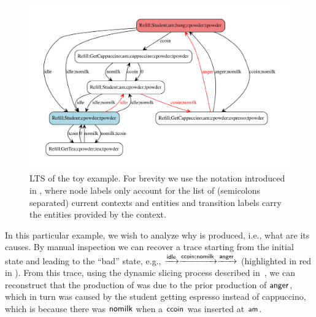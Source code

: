 \begin{figure}
\includegraphics[scale=.3]{./figs/toylts-traced}
\caption{LTS of the toy example. For brevity we use the notation introduced in , where node labels only account for the list of (semicolons separated) current contexts and entities and transition labels carry the entities provided by the context.\label{fig:toylts}}
\end{figure}

In this particular example, we wish to analyze why \bang is produced, i.e., what are its causes. By manual inspection we can recover a trace starting from the initial state and leading to the ``bad'' state, e.g., $\xrightarrow{{\text{\sffamily idle}}}\xrightarrow{{\text{\sffamily ccoin}};{\text{\sffamily nomilk}}}\xrightarrow{{\text{\sffamily anger}}}$ (highlighted in red in ). 
From this trace, using the dynamic slicing process described in~\cite{DBLP:journals/nc/BrodoBF24}, we can reconstruct that the production of \bang was due to the prior production of ${\text{\sffamily anger}}$, which in turn was caused by the student getting espresso instead of cappuccino, which is because there was ${\text{\sffamily nomilk}}$ when a ${\text{\sffamily ccoin}}$ was inserted at ${\text{\sffamily am}}$.

